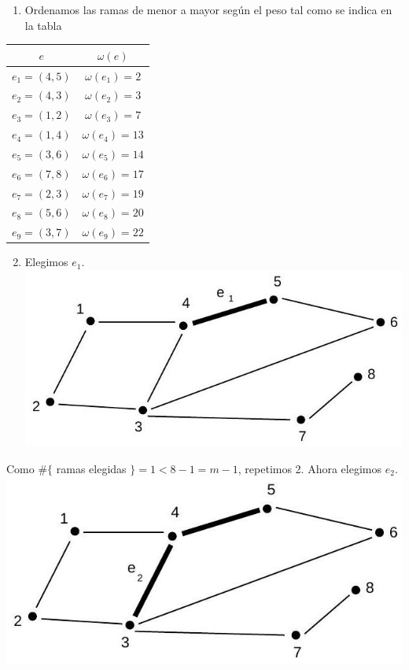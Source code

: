 \documentclass[10pt]{article}
\begin{document}
\begin{enumerate}
  \item Ordenamos las ramas de menor a mayor según el peso tal como se indica en la tabla
\end{enumerate}

\begin{center}
\begin{tabular}{|c|c|}
\hline
$e$ & $\omega(e)$ \\
\hline
$e_{1}=(4,5)$ & $\omega\left(e_{1}\right)=2$ \\
\hline
$e_{2}=(4,3)$ & $\omega\left(e_{2}\right)=3$ \\
\hline
$e_{3}=(1,2)$ & $\omega\left(e_{3}\right)=7$ \\
\hline
$e_{4}=(1,4)$ & $\omega\left(e_{4}\right)=13$ \\
\hline
$e_{5}=(3,6)$ & $\omega\left(e_{5}\right)=14$ \\
\hline
$e_{6}=(7,8)$ & $\omega\left(e_{6}\right)=17$ \\
\hline
$e_{7}=(2,3)$ & $\omega\left(e_{7}\right)=19$ \\
\hline
$e_{8}=(5,6)$ & $\omega\left(e_{8}\right)=20$ \\
\hline
$e_{9}=(3,7)$ & $\omega\left(e_{9}\right)=22$ \\
\hline
\end{tabular}
\end{center}

\begin{enumerate}
  \setcounter{enumi}{1}
  \item Elegimos $e_{1}$.\\
\includegraphics[max width=\textwidth, center]{2025_09_05_93c7c1835f249f70c0eeg-15}
\end{enumerate}

Como $\#\{$ ramas elegidas $\}=1<8-1=m-1$, repetimos 2. Ahora elegimos $e_{2}$.\\
\includegraphics[max width=\textwidth, center]{2025_09_05_93c7c1835f249f70c0eeg-15(2)}
\end{document}
